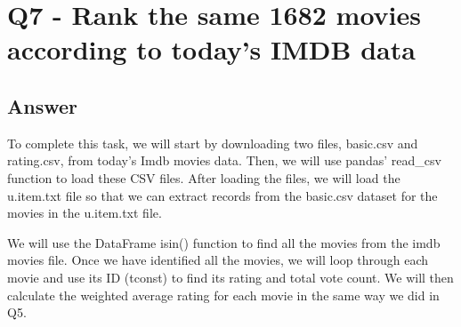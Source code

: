 \documentclass[12pt]{article}
\begin{document}
\clearpage

\section*{Q7 - Rank the same 1682 movies according to today's IMDB data}

\subsection*{Answer}
To complete this task, we will start by downloading two files, basic.csv and rating.csv, from today's Imdb movies data. Then, we will use pandas' read\_csv function to load these CSV files. After loading the files, we will load the u.item.txt file so that we can extract records from the basic.csv dataset for the movies in the u.item.txt file.

We will use the DataFrame isin() function to find all the movies from the imdb movies file. Once we have identified all the movies, we will loop through each movie and use its ID (tconst) to find its rating and total vote count. We will then calculate the weighted average rating for each movie in the same way we did in Q5.
\end{document}
